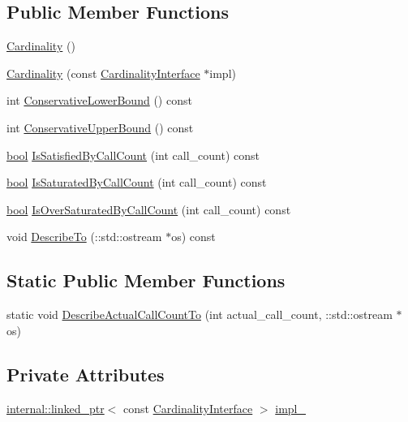 \subsection*{Public Member Functions}
\begin{DoxyCompactItemize}
\item 
\hyperlink{classtesting_1_1Cardinality_ab4b4066d7f5e9e3c7f851e49ab892cd9}{Cardinality} ()
\item 
\hyperlink{classtesting_1_1Cardinality_a10aed768b8a22d27110587444733771f}{Cardinality} (const \hyperlink{classtesting_1_1CardinalityInterface}{Cardinality\+Interface} $\ast$impl)
\item 
int \hyperlink{classtesting_1_1Cardinality_ac1785ee5c466c2524f36b9ffb5f46c79}{Conservative\+Lower\+Bound} () const
\item 
int \hyperlink{classtesting_1_1Cardinality_acb42e3683f99b986f3ac538b5eefbc31}{Conservative\+Upper\+Bound} () const
\item 
\hyperlink{classbool}{bool} \hyperlink{classtesting_1_1Cardinality_a6c5e2bd2887ff06e20e6fcc4255a0c1c}{Is\+Satisfied\+By\+Call\+Count} (int call\+\_\+count) const
\item 
\hyperlink{classbool}{bool} \hyperlink{classtesting_1_1Cardinality_a57128ba46931e24a2b39af177e3346f8}{Is\+Saturated\+By\+Call\+Count} (int call\+\_\+count) const
\item 
\hyperlink{classbool}{bool} \hyperlink{classtesting_1_1Cardinality_a9b6a55179f6dcc8fadec26e6d93f3e88}{Is\+Over\+Saturated\+By\+Call\+Count} (int call\+\_\+count) const
\item 
void \hyperlink{classtesting_1_1Cardinality_a2955f4b65022c422f56e79b767c4fa71}{Describe\+To} (\+::std\+::ostream $\ast$os) const
\end{DoxyCompactItemize}
\subsection*{Static Public Member Functions}
\begin{DoxyCompactItemize}
\item 
static void \hyperlink{classtesting_1_1Cardinality_a7cbea339e2f3072a98367e087aa296e8}{Describe\+Actual\+Call\+Count\+To} (int actual\+\_\+call\+\_\+count, \+::std\+::ostream $\ast$os)
\end{DoxyCompactItemize}
\subsection*{Private Attributes}
\begin{DoxyCompactItemize}
\item 
\hyperlink{classtesting_1_1internal_1_1linked__ptr}{internal\+::linked\+\_\+ptr}$<$ const \hyperlink{classtesting_1_1CardinalityInterface}{Cardinality\+Interface} $>$ \hyperlink{classtesting_1_1Cardinality_ae8c43c635af16756d535b491ccf19c2f}{impl\+\_\+}
\end{DoxyCompactItemize}


